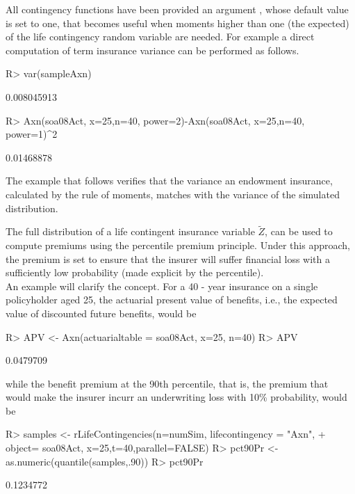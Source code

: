 \documentclass[nojss]{jss}
\begin{document}
All contingency functions have been provided an argument , whose
default value is set to one, that becomes useful when moments higher than one
(the expected) of the life contingency random variable are needed. For example a
direct computation of term insurance variance can be performed as follows.

\begin{Schunk}
\begin{Sinput}
R> var(sampleAxn)
\end{Sinput}
\begin{Soutput}
[1] 0.008045913
\end{Soutput}
\begin{Sinput}
R> Axn(soa08Act, x=25,n=40, power=2)-Axn(soa08Act, x=25,n=40, power=1)^2
\end{Sinput}
\begin{Soutput}
[1] 0.01468878
\end{Soutput}
\end{Schunk}

The example that follows verifies that the variance an endowment insurance, 
calculated by the rule of moments, matches with the variance of the simulated
distribution.


The full distribution of a life contingent insurance variable $\tilde Z$, can be
used to compute premiums using the percentile premium principle. Under this
approach, the premium is set to ensure that the insurer will suffer financial loss
with a sufficiently low probability (made explicit by the percentile).\\
An example will clarify the concept. For a 40 - year
insurance on a single policyholder aged 25, the actuarial present value of benefits, 
i.e., the expected value of discounted future benefits, would be

\begin{Schunk}
\begin{Sinput}
R> APV <- Axn(actuarialtable = soa08Act, x=25, n=40)
R> APV
\end{Sinput}
\begin{Soutput}
[1] 0.0479709
\end{Soutput}
\end{Schunk}

while the benefit premium at the 90th percentile, that is, the premium that would
make the insurer incurr an underwriting loss with 10\% probability,
would be




\begin{Schunk}
\begin{Sinput}
R> samples <- rLifeContingencies(n=numSim, lifecontingency = "Axn", 
+  		object= soa08Act, x=25,t=40,parallel=FALSE)
R> pct90Pr <- as.numeric(quantile(samples,.90))
R> pct90Pr
\end{Sinput}
\begin{Soutput}
[1] 0.1234772
\end{Soutput}
\end{Schunk}
\end{document}
